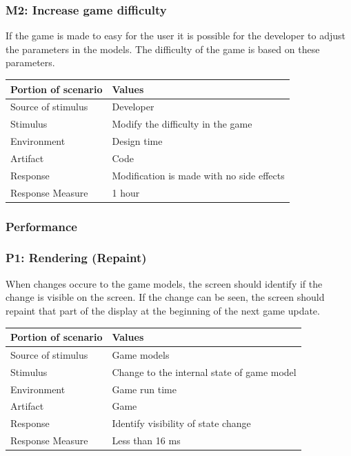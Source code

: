 \subsubsection* {M2: Increase game difficulty}
If the game is made to easy for the user it is possible for the developer to adjust the
parameters in the models. The difficulty of the game is based on these parameters.

\begin{tabular}{| l | l |}
	\hline
	\rowcolor{gray}
	{\bf Portion of scenario} & {\bf Values} \\ \hline
	Source of stimulus & Developer\\ \hline
	Stimulus & Modify the difficulty in the game\\ \hline
	Environment & Design time \\ \hline
	Artifact & Code \\ \hline
	Response & Modification is made with no side effects\\ \hline
	Response Measure & 1 hour\\ \hline
\end{tabular}

\subsubsection{Performance}

\subsubsection*{P1: Rendering (Repaint)}
When changes occure to the game models, the screen should identify if the change 
is visible on the screen. If the change can be seen, the screen should repaint 
that part of the display at the beginning of the next game update.

\begin{tabular}{| l | l |}
	\hline
	\rowcolor{gray}
	{\bf Portion of scenario} & {\bf Values} \\ \hline
	Source of stimulus & Game models\\ \hline
	Stimulus & Change to the internal state of game model\\ \hline
	Environment & Game run time \\ \hline
	Artifact &  Game \\ \hline
	Response & Identify visibility of state change\\ \hline
	Response Measure & Less than 16 ms\\ \hline
\end{tabular}

